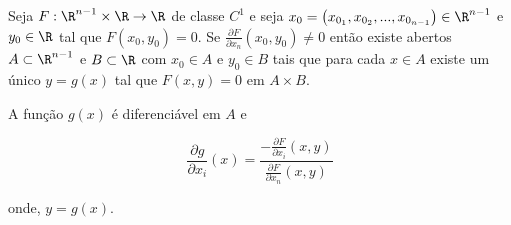 \documentclass{book}
\begin{document}
\begin{teo}
    Seja $F:\R^{n - 1}  \times \R \to \R$ de classe $C^1$ e seja $x_0  = \left( {x_{0_1 } ,x_{0_2 } ,...,x_{0_{n - 1} } } \right) \in \R^{n - 1}$ e $y_0 \in \R$ tal que $F\left( {x_0 ,y_0 } \right) = 0$. Se $\frac{{\partial F}}{{\partial x_n }}\left( {x_0 ,y_0 } \right) \ne 0$ ent\~ao existe abertos $A \subset \R^{n - 1}$ e $B \subset \R$ com $x_0 \in A$ e $y_0 \in B$ tais que para cada $x \in A$ existe um \'unico $y = g(x)$ tal que $F\left( {x,y} \right) = 0$ em $A \times B$.

A fun\c c\~ao $g(x)$ \'e diferenci\'avel em $A$ e

\[\displaystyle
\frac{{\partial g}}{{\partial x_i }}\left( x \right) = \displaystyle \frac{{\displaystyle - \frac{{\partial F}}{{\partial x_i }}\left( {x,y} \right)}}
{{\displaystyle \frac{{\partial F}}{{\partial x_n }}\left( {x,y} \right)}}
\]

onde, $y = g\left( x \right)$.
\end{teo}
\end{document}
